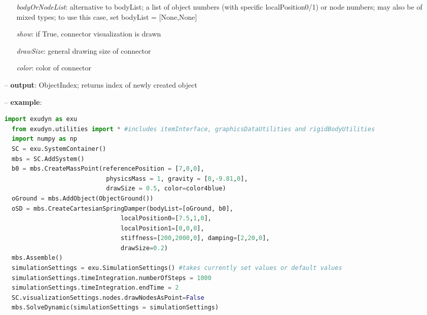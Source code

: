 \begin{itemize}[leftmargin=0.7cm]
\begin{itemize}[leftmargin=1.2cm]
\item[]{\it bodyOrNodeList}: alternative to bodyList; a list of object numbers (with specific localPosition0/1) or node numbers; may also be of mixed types; to use this case, set bodyList = [None,None]
\item[]{\it show}: if True, connector visualization is drawn
\item[]{\it drawSize}: general drawing size of connector
\item[]{\it color}: color of connector
\end{itemize}
\item[--]
{\bf output}: ObjectIndex; returns index of newly created object
\item[--]
{\bf example}: \vspace{-12pt}\ei\begin{lstlisting}[language=Python, xleftmargin=36pt]
  import exudyn as exu
  from exudyn.utilities import * #includes itemInterface, graphicsDataUtilities and rigidBodyUtilities
  import numpy as np
  SC = exu.SystemContainer()
  mbs = SC.AddSystem()
  b0 = mbs.CreateMassPoint(referencePosition = [7,0,0],
                            physicsMass = 1, gravity = [0,-9.81,0],
                            drawSize = 0.5, color=color4blue)
  oGround = mbs.AddObject(ObjectGround())
  oSD = mbs.CreateCartesianSpringDamper(bodyList=[oGround, b0],
                                localPosition0=[7.5,1,0],
                                localPosition1=[0,0,0],
                                stiffness=[200,2000,0], damping=[2,20,0],
                                drawSize=0.2)
  mbs.Assemble()
  simulationSettings = exu.SimulationSettings() #takes currently set values or default values
  simulationSettings.timeIntegration.numberOfSteps = 1000
  simulationSettings.timeIntegration.endTime = 2
  SC.visualizationSettings.nodes.drawNodesAsPoint=False
  mbs.SolveDynamic(simulationSettings = simulationSettings)
\end{lstlisting}\vspace{-24pt}\bi\item[]\vspace{-24pt}\vspace{12pt}\end{itemize}
%

